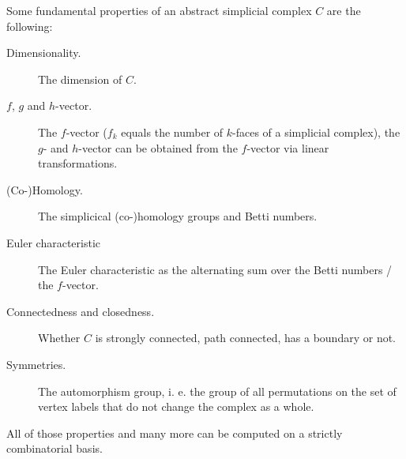 \documentclass[a4paper,11pt]{report}
\begin{document}
{{ Some fundamental properties of an abstract simplicial complex $C$ are the following: 
\begin{description}
\item[{Dimensionality.}] The dimension of $C$.
\item[{$f$, $g$ and $h$-vector.}]  The $f$-vector ($f_k$ equals the number of $k$-faces of a simplicial complex), the $g$- and $h$-vector can be obtained from the $f$-vector via linear transformations.
\item[{(Co-)Homology.}] The simplicical (co-)homology groups and Betti numbers.
\item[{Euler characteristic}] The Euler characteristic as the alternating sum over the Betti numbers / the $f$-vector.
\item[{Connectedness and closedness.}] Whether $C$ is strongly connected, path connected, has a boundary or not.
\item[{Symmetries.}] The automorphism group, i. e. the group of all permutations on the set of
vertex labels that do not change the complex as a whole.
\end{description}
 

 All of those properties and many more can be computed on a strictly
combinatorial basis. }


}
\end{document}
